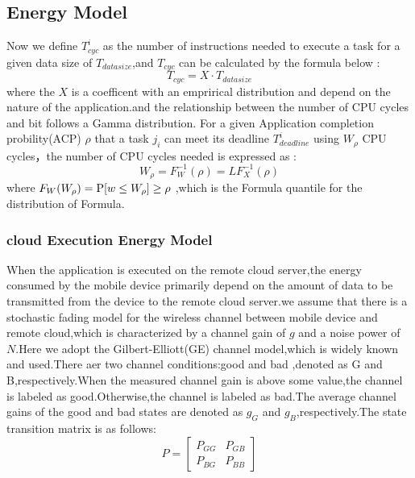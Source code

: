 \documentclass[review]{elsarticle}
\begin{document}
        \subsection{Energy Model}
            Now we define $T_{cyc}^i$ as the number of instructions needed to execute a task for a given data size of $T_{datasize} $,and $T_{cyc}$ can be calculated by the formula below :\\
            $$ T_{cyc} = X\cdot T_{datasize} $$
            where the $X$ is a coefficent with an emprirical distribution\citep{lorch2001improving} and depend on the nature of the application.and the relationship between the number of CPU cycles and bit follows a Gamma distribution\citep{lorch2001improving}.
            For a given Application completion probility(ACP) $\rho$ that a task $j_i$ can meet its deadline $T_{deadline}^i$ using $W_{\rho} $ CPU cycles，the number of
            CPU cycles needed is expressed as :\\
            $$W_{\rho}=F_{W}^{-1}(\rho)=LF_{X}^{-1}(\rho)$$
            where $F_{W}(W_{\rho})={\rm P}[w\leq W_{\rho}]\geq\rho$ \cite{wen2012energy},which is the Formula quantile for the distribution of Formula.

            \subsubsection{cloud Execution Energy Model}
             \noindent When the application is executed on the remote cloud server,the energy consumed by the mobile device primarily depend on the amount of data to be transmitted from the device to the remote cloud server.we assume that there is a stochastic fading model for the wireless channel between mobile device and remote cloud,which is characterized by a channel gain of $g$ and a noise power of $ N$.Here we adopt the Gilbert-Elliott(GE) channel model\citep{zafer2007minimum},which is widely known and used.There aer two channel conditions:good and bad ,denoted as G and B,respectively.When the measured channel gain is above some value,the channel is labeled as good.Otherwise,the channel is labeled as bad.The average channel gains of the good and bad states are denoted as  $g_{G}$ and  $g_{B}$,respectively.The state transition matrix is as follows: \\
             $$P=\begin{bmatrix}P_{GG} & P_{GB} \\P_{BG} &P_{BB} \end{bmatrix}$$
\end{document}
